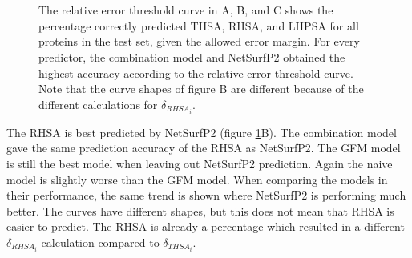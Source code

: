 \documentclass[11pt,a4paper]{article}
\begin{document}
\begin{figure}[h!]
  \centering
  \\
  \\
  \caption{The relative error threshold curve in A, B, and C shows the percentage correctly predicted THSA, RHSA, and LHPSA for all proteins in the test set, given the allowed error margin. For every predictor, the combination model and NetSurfP2 obtained the highest accuracy according to the relative error threshold curve. Note that the curve shapes of figure B are different because of the different calculations for $\delta_{RHSA_i}$.}
  \label{predictfig}
\end{figure}

The RHSA is best predicted by NetSurfP2 (figure \ref{predictfig}B). The combination model gave the same prediction accuracy of the RHSA as NetSurfP2. The GFM model is still the best model when leaving out NetSurfP2 prediction. Again the naive model is slightly worse than the GFM model. When comparing the models in their performance, the same trend is shown where NetSurfP2 is performing much better. The curves have different shapes, but this does not mean that RHSA is easier to predict. The RHSA is already a percentage which resulted in a different $\delta_{RHSA_i}$ calculation compared to $\delta_{THSA_i}$.
\end{document}
